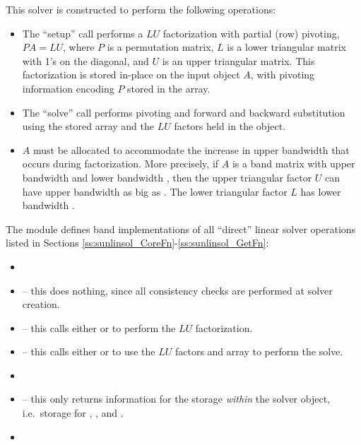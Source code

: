 This solver is constructed to perform the following operations:
\begin{itemize}
\item The ``setup'' call performs a $LU$ factorization with
  partial (row) pivoting, $PA=LU$, where $P$ is a permutation matrix,
  $L$ is a lower triangular matrix with 1's on the diagonal, and $U$
  is an upper triangular matrix.  This factorization is stored
  in-place on the input {\sunmatband} object $A$, with pivoting
  information encoding $P$ stored in the  array.
\item The ``solve'' call performs pivoting and forward and
  backward substitution using the stored  array and the
  $LU$ factors held in the {\sunmatband} object.
\item
  {\warn} $A$ must be allocated to accommodate the increase in upper
  bandwidth that occurs during factorization.  More precisely, if $A$
  is a band matrix with upper bandwidth  and lower bandwidth
  , then the upper triangular factor $U$ can have upper
  bandwidth as big as . The lower triangular
  factor $L$ has lower bandwidth .
\end{itemize}



\noindent The {\sunlinsollapband} module defines band implementations of all
``direct'' linear solver operations listed in Sections
\ref{ss:sunlinsol_CoreFn}-\ref{ss:sunlinsol_GetFn}:
\begin{itemize}
\item {}
\item {} -- this does nothing, since all
  consistency checks are performed at solver creation.
\item {} -- this calls either
   or  to perform the $LU$ factorization.
\item {} -- this calls either
   or  to use the $LU$ factors and 
  array to perform the solve.
\item {}
\item {} -- this only returns information for
  the storage \emph{within} the solver object, i.e.~storage
  for , , and .
\item {}
\end{itemize}
